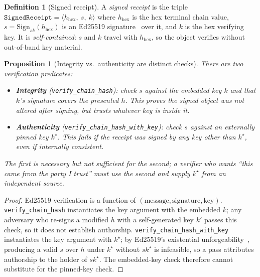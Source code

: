 \documentclass[11pt,oneside]{book}
\theoremstyle{definition}
\newtheorem{definition}{Definition}[chapter]
\theoremstyle{plain}
\newtheorem{proposition}[theorem]{Proposition}
\theoremstyle{remark}
\newcommand{\code}[1]{\texttt{#1}}
\begin{document}
\begin{definition}[Signed receipt]\label{def:signed}
A \emph{signed receipt} is the triple $\code{SignedReceipt}=\langle h_{\mathrm{hex}},\ s,\ k\rangle$ where $h_{\mathrm{hex}}$ is the hex terminal chain value, $s=\mathrm{Sign}_{sk}(h_{\mathrm{hex}})$ is an Ed25519 signature~\cite{ed25519} over it, and $k$ is the hex verifying key. %
It is \emph{self-contained}: $s$ and $k$ travel with $h_{\mathrm{hex}}$, so the object verifies without out-of-band key material. %
\end{definition}

\begin{proposition}[Integrity vs.\ authenticity are distinct checks]\label{prop:intauth}
There are two verification predicates: %
\begin{itemize}[leftmargin=*]
\item \textbf{Integrity} (\code{verify\_chain\_hash}): check $s$ against the \emph{embedded}
key $k$ and that $k$'s signature covers the presented $h$. %
This proves the signed object was not altered after signing, but trusts whatever key is inside it. %
\item \textbf{Authenticity} (\code{verify\_chain\_hash\_with\_key}): check $s$ against an
\emph{externally pinned} key $k^{\star}$. %
This fails if the receipt was signed by any key other than $k^{\star}$, even if internally consistent. %
\end{itemize}
The first is necessary but not sufficient for the second; a verifier who wants ``this came from the party I trust'' must use the second and supply $k^{\star}$ from an independent source. %
\end{proposition}

\begin{proof}
Ed25519 verification is a function of $(\text{message},\text{signature},\text{key})$. %
\code{verify\_chain\_hash} instantiates the key argument with the embedded $k$; any adversary who re-signs a modified $h$ with a self-generated key $k'$ passes this check, so it does not establish authorship. %
\code{verify\_chain\_hash\_with\_key} instantiates the key argument with $k^{\star}$; by Ed25519's existential unforgeability~\cite{ed25519}, producing a valid $s$ over $h$ under $k^{\star}$ without $sk^{\star}$ is infeasible, so a pass attributes authorship to the holder of $sk^{\star}$. %
The embedded-key check therefore cannot substitute for the pinned-key check. %
\end{proof} %
\end{document}
